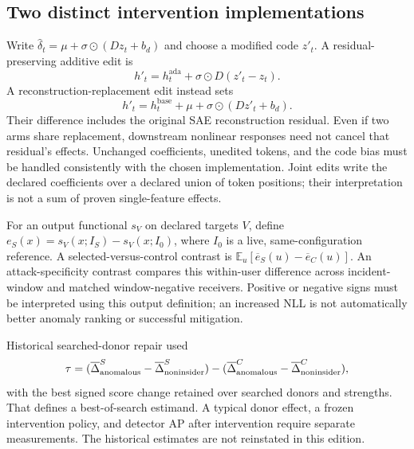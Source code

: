 \subsection{Two distinct intervention implementations}
Write $\widehat\delta_t=\mu+\sigma\odot(Dz_t+b_d)$ and choose a modified code
$z'_t$. A residual-preserving additive edit is
\begin{equation}
 h'_t=h^{\mathrm{ada}}_t+\sigma\odot D(z'_t-z_t).
\label{eq:additive}
\end{equation}
A reconstruction-replacement edit instead sets
\begin{equation}
 h'_t=h^{\mathrm{base}}_t+\mu+\sigma\odot(Dz'_t+b_d).
\label{eq:replacement}
\end{equation}
Their difference includes the original SAE reconstruction residual. Even if two
arms share replacement, downstream nonlinear responses need not cancel that
residual's effects. Unchanged coefficients, unedited tokens, and the code bias
must be handled consistently with the chosen implementation. Joint edits write
the declared coefficients over a declared union of token positions; their
interpretation is not a sum of proven single-feature effects.

For an output functional $s_V$ on declared targets $V$, define
$e_S(x)=s_V(x;I_S)-s_V(x;I_0)$, where $I_0$ is a live, same-configuration
reference. A selected-versus-control contrast is
$\mathbb E_u[\overline e_S(u)-\overline e_C(u)]$. An attack-specificity contrast
compares this within-user difference across incident-window and matched
window-negative receivers. Positive or negative signs must be interpreted using
this output definition; an increased NLL is not automatically better anomaly
ranking or successful mitigation.

Historical searched-donor repair used
\begin{equation}
 \tau=(\overline\Delta^S_{\rm anomalous}-\overline\Delta^S_{\rm noninsider})
       -(\overline\Delta^C_{\rm anomalous}-\overline\Delta^C_{\rm noninsider}),
\end{equation}
with the best signed score change retained over searched donors and strengths.
That defines a best-of-search estimand. A typical donor effect, a frozen
intervention policy, and detector AP after intervention require separate
measurements. The historical estimates are not reinstated in this edition.

